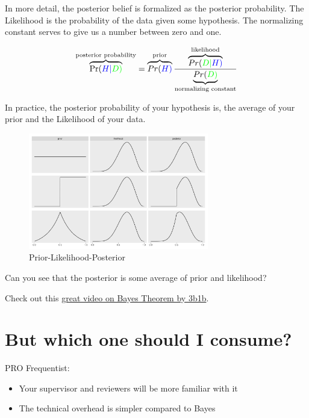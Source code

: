 \documentclass[
  letterpaper,
  DIV=11,
  numbers=noendperiod]{scrreprt}
\providecommand{\tightlist}{%
  \setlength{\itemsep}{0pt}\setlength{\parskip}{0pt}}\usepackage{longtable,booktabs,array}
\theoremstyle{definition}
\theoremstyle{definition}
\theoremstyle{remark}
\begin{document}
In more detail, the posterior belief is formalized as the posterior
probability. The Likelihood is the probability of the data given some
hypothesis. The normalizing constant serves to give us a number between
zero and one.

\[\overbrace{\Pr(\color{blue}{H}|\color{green}{D})}^\text{posterior probability} = \overbrace{Pr(\color{blue}{H})}^\text{prior} \frac{\overbrace{Pr(\color{green}{D}|\color{blue}{H})}^\text{likelihood}}{\underbrace{Pr(\color{green}{D})}_{\text{normalizing constant}}}\]

In practice, the posterior probability of your hypothesis is, the
average of your prior and the Likelihood of your data.

\begin{figure}

{\centering \includegraphics[width=0.7\textwidth,height=\textheight]{./img/prior-l-post.png}

}

\caption{Prior-Likelihood-Posterior}

\end{figure}

Can you see that the posterior is some average of prior and likelihood?

Check out this \href{https://youtu.be/HZGCoVF3YvM}{great video on Bayes
Theorem by 3b1b}.

\hypertarget{but-which-one-should-i-consume}{%
\section{But which one should I
consume?}\label{but-which-one-should-i-consume}}

PRO Frequentist:

\begin{itemize}
\tightlist
\item
  Your supervisor and reviewers will be more familiar with it
\item
  The technical overhead is simpler compared to Bayes
\end{itemize}
\end{document}
